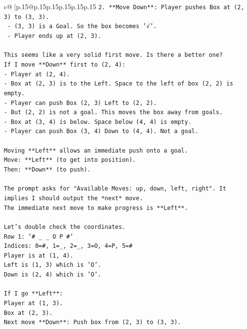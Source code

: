 \documentclass{article}
\begin{document}
{\begin{supertabular}{c@{$\;$}|p{.15\linewidth}@{}p{.15\linewidth}p{.15\linewidth}p{.15\linewidth}p{.15\linewidth}p{.15\linewidth}}
{{{\texttt{2. **Move Down**: Player pushes Box at (2, 3) to (3, 3).} \\
\texttt{   {-} (3, 3) is a Goal. So the box becomes '√'.} \\
\texttt{   {-} Player ends up at (2, 3).} \\
\\ 
\texttt{This seems like a very solid first move. Is there a better one?} \\
\texttt{If I move **Down** first to (2, 4):} \\
\texttt{{-} Player at (2, 4).} \\
\texttt{{-} Box at (2, 3) is to the Left. Space to the left of box (2, 2) is empty.} \\
\texttt{{-} Player can push Box (2, 3) Left to (2, 2).} \\
\texttt{{-} But (2, 2) is not a goal. This moves the box away from goals.} \\
\texttt{{-} Box at (3, 4) is below. Space below (4, 4) is empty.} \\
\texttt{{-} Player can push Box (3, 4) Down to (4, 4). Not a goal.} \\
\\ 
\texttt{Moving **Left** allows an immediate push onto a goal.} \\
\texttt{Move: **Left** (to get into position).} \\
\texttt{Then: **Down** (to push).} \\
\\ 
\texttt{The prompt asks for "Available Moves: up, down, left, right". It implies I should output the *next* move.} \\
\texttt{The immediate next move to make progress is **Left**.} \\
\\ 
\texttt{Let's double check the coordinates.} \\
\texttt{Row 1: `\# \_ \_ O P \#`} \\
\texttt{Indices: 0=\#, 1=\_, 2=\_, 3=O, 4=P, 5=\#} \\
\texttt{Player is at (1, 4).} \\
\texttt{Left is (1, 3) which is 'O'.} \\
\texttt{Down is (2, 4) which is 'O'.} \\
\\ 
\texttt{If I go **Left**:} \\
\texttt{Player at (1, 3).} \\
\texttt{Box at (2, 3).} \\
\texttt{Next move **Down**: Push box from (2, 3) to (3, 3).} \\
}}}
\end{supertabular}}
\end{document}
